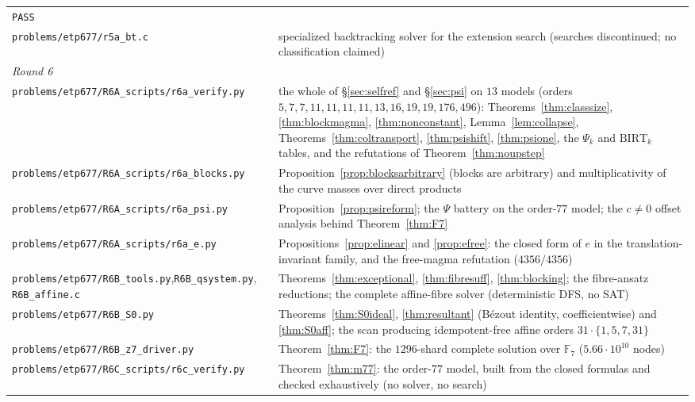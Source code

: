 \documentclass[11pt]{article}
\theoremstyle{plain}
\theoremstyle{definition}
\theoremstyle{remark}
\numberwithin{equation}{section}
\newcommand{\F}{\mathbb{F}}
\begin{document}
\begin{longtable}{p{}p{}}
\texttt{PASS}\\
\texttt{problems\slash etp677\slash r5a\_bt.c} & specialized backtracking solver for the extension
search (searches discontinued; no classification claimed)\\
\midrule
\multicolumn{2}{l}{\emph{Round 6}}\\
\midrule
\texttt{problems\slash etp677\slash R6A\_scripts\slash r6a\_verify.py} & the whole of
\S\ref{sec:selfref} and \S\ref{sec:psi} on $13$ models (orders
$5,7,7,11,11,11,11,13,16,19,19,176,496$): Theorems~\ref{thm:classsize},
\ref{thm:blockmagma}, \ref{thm:nonconstant}, Lemma~\ref{lem:collapse},
Theorems~\ref{thm:coltransport}, \ref{thm:psishift}, \ref{thm:psione}, the $\Psi_k$ and
$\mathrm{BIRT}_k$ tables, and the refutations of Theorem~\ref{thm:noupstep}\\
\texttt{problems\slash etp677\slash R6A\_scripts\slash r6a\_blocks.py} &
Proposition~\ref{prop:blocksarbitrary} (blocks are arbitrary) and multiplicativity of the
curve masses over direct products\\
\texttt{problems\slash etp677\slash R6A\_scripts\slash r6a\_psi.py} &
Proposition~\ref{prop:psireform}; the $\Psi$ battery on the order-$77$ model; the $c\ne0$
offset analysis behind Theorem~\ref{thm:F7}\\
\texttt{problems\slash etp677\slash R6A\_scripts\slash r6a\_e.py} &
Propositions~\ref{prop:elinear} and \ref{prop:efree}: the closed form of $e$ in the
translation-invariant family, and the free-magma refutation ($4356/4356$)\\
\texttt{problems\slash etp677\slash R6B\_tools.py},\newline\texttt{R6B\_qsystem.py},
\texttt{R6B\_affine.c} & Theorems~\ref{thm:exceptional}, \ref{thm:fibresuff},
\ref{thm:blocking}; the fibre-ansatz reductions; the complete affine-fibre solver
(deterministic DFS, no SAT)\\
\texttt{problems\slash etp677\slash R6B\_S0.py} & Theorems~\ref{thm:S0ideal},
\ref{thm:resultant} (Bézout identity, coefficientwise) and \ref{thm:S0aff}; the scan
producing idempotent-free affine orders $31\cdot\{1,5,7,31\}$\\
\texttt{problems\slash etp677\slash R6B\_z7\_driver.py} & Theorem~\ref{thm:F7}: the
$1296$-shard complete solution over $\F_7$ ($5.66\cdot10^{10}$ nodes)\\
\texttt{problems\slash etp677\slash R6C\_scripts\slash r6c\_verify.py} &
Theorem~\ref{thm:m77}: the order-$77$ model, built from the closed formulas and checked
exhaustively (no solver, no search)\\

\end{longtable}
\end{document}
